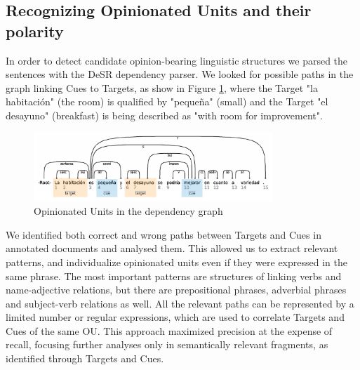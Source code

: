 \documentclass{llncs}
\begin{document}
\subsection{Recognizing Opinionated Units and their polarity}

In order to detect candidate opinion-bearing linguistic structures we parsed the sentences with the DeSR dependency parser\cite{attardi_multilingual_2007}. We looked for possible paths in the graph linking Cues to Targets, as show in Figure \ref{fig:GRAFO}, where the Target "la habitación" (the room) is qualified by "pequeña" (small) and the Target "el desayuno" (breakfast) is being described as "with room for improvement".

\begin{figure}[ht]
\centering
\includegraphics[width=9cm]{grafo.pdf}
\caption{Opinionated Units in the dependency graph}
\label{fig:GRAFO}
\end{figure}

We identified both correct and wrong paths between Targets and Cues in annotated documents and analysed them. This allowed us to extract relevant patterns, and individualize opinionated units even if they were expressed in the same phrase. The most important patterns are structures of linking verbs and name-adjective relations, but there are prepositional phrases, adverbial phrases and subject-verb relations as well. All the relevant paths can be represented by a limited number or regular expressions, which are used to correlate Targets and Cues of the same OU. This approach maximized precision at the expense of recall, focusing further analyses only in semantically relevant fragments, as identified through Targets and Cues.
\end{document}
